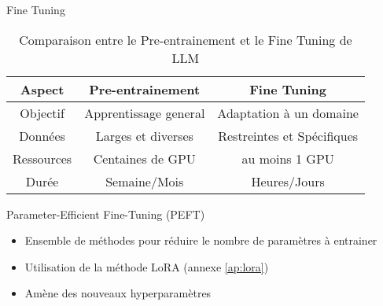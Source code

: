 \begin{frame}{Fine Tuning}
    \begin{table}[h!]
        \centering
        \begin{tabular}{|c|c|c|}
            \hline
            \textbf{Aspect} & \textbf{Pre-entrainement} & \textbf{Fine Tuning} \\
            \hline
            Objectif & Apprentissage general & Adaptation à un domaine \\
            \hline
            Données & Larges et diverses & Restreintes et Spécifiques \\
            \hline
            Ressources & Centaines de GPU & au moins 1 GPU \\
            \hline
            Durée & Semaine/Mois & Heures/Jours \\
            \hline
        \end{tabular}
        \caption{Comparaison entre le Pre-entrainement et le Fine Tuning de LLM}
        \label{tab:pretrain_vs_finetune}
    \end{table}

    \begin{block}{Parameter-Efficient Fine-Tuning (PEFT)}
        \begin{itemize}
            \item Ensemble de méthodes pour réduire le nombre de paramètres à entrainer
            \item Utilisation de la méthode LoRA (annexe \ref{ap:lora})
            \item Amène des nouveaux hyperparamètres
        \end{itemize}
        
    \end{block}
\end{frame}

